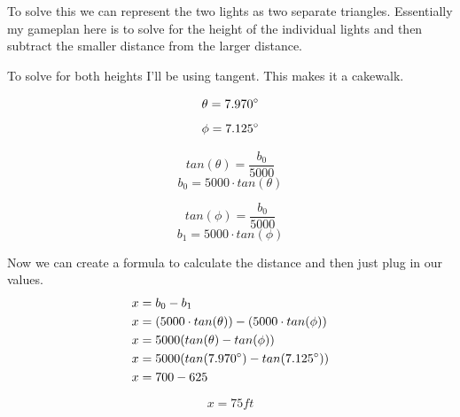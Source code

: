 \documentclass[10pt,letterpaper]{amspset}
\begin{document}
\begin{solution}
To solve this we can represent the two lights as two separate triangles. Essentially my gameplan here is to solve for the height of the individual lights and then subtract the smaller distance from the larger distance.


\bigskip


To solve for both heights I'll be using tangent. This makes it a cakewalk.

\[\theta = 7.970\degree\]
\[\phi = 7.125\degree\]

\bigskip

\[tan(\theta) = \frac{b_0}{5000}\]
\[\boxed{b_0 = 5000 \cdot tan(\theta)}\]

\bigskip

\[tan(\phi) = \frac{b_0}{5000}\]
\[\boxed{b_1 = 5000 \cdot tan(\phi)}\]


Now we can create a formula to calculate the distance and then just plug in our values.
\begin{align}
    x &= b_0 - b_1 \\
    x &= (5000 \cdot tan(\theta)) - (5000 \cdot tan(\phi)) \\
    x &= 5000( tan(\theta) - tan(\phi)) \\
    x &= 5000( tan(7.970\degree) - tan(7.125\degree)) \\
    x &= 700 - 625
\end{align}

\[\boxed{x = 75ft}\]
\end{solution}
\end{document}
